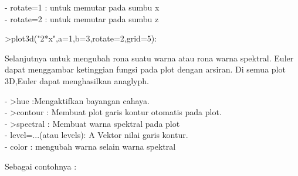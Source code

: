 \documentclass[a4paper,10pt]{article}
\begin{document}
\begin{eulernotebook}
\begin{eulercomment}
\begin{eulercomment}
\begin{eulercomment}
- rotate=1 : untuk memutar pada sumbu x\\
- rotate=2 : untuk memutar pada sumbu z
\end{eulercomment}
\begin{eulerprompt}
>plot3d("2*x",a=1,b=3,rotate=2,grid=5):
\end{eulerprompt}
\begin{eulercomment}
Selanjutnya untuk mengubah rona suatu warna atau rona warna spektral.
Euler dapat menggambar ketinggian fungsi pada plot dengan arsiran. Di
semua plot 3D,Euler dapat menghasilkan anaglyph.

- \textgreater{}hue :Mengaktifkan bayangan cahaya.\\
- \textgreater{}contour : Membuat plot garis kontur otomatis pada plot.\\
- \textgreater{}spectral : Membuat warna spektral pada plot\\
- level=...(atau levels): A Vektor nilai garis kontur.\\
- color : mengubah warna selain warna spektral

Sebagai contohnya :


\end{eulercomment}
\end{eulercomment}
\end{eulercomment}
\end{eulernotebook}
\end{document}
